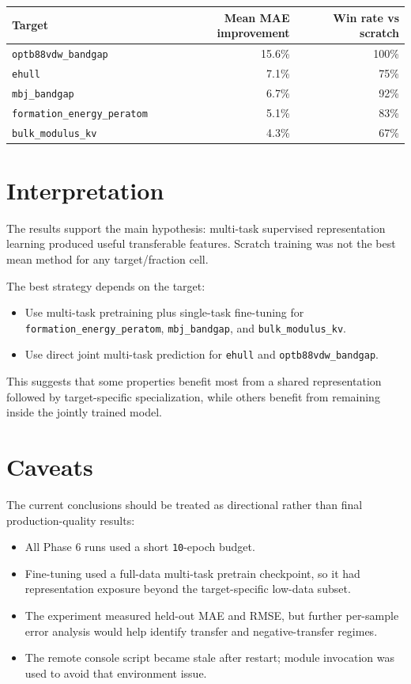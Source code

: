 \documentclass[11pt,a4paper]{article}
\begin{document}
\begin{center}
\begin{tabular}{lrr}
\toprule
Target & Mean MAE improvement & Win rate vs scratch \\
\midrule
\texttt{optb88vdw\_bandgap} & 15.6\% & 100\% \\
\texttt{ehull} & 7.1\% & 75\% \\
\texttt{mbj\_bandgap} & 6.7\% & 92\% \\
\texttt{formation\_energy\_peratom} & 5.1\% & 83\% \\
\texttt{bulk\_modulus\_kv} & 4.3\% & 67\% \\
\bottomrule
\end{tabular}
\end{center}

\section{Interpretation}

The results support the main hypothesis: multi-task supervised representation learning produced useful transferable features.  Scratch training was not the best mean method for any target/fraction cell.

The best strategy depends on the target:

\begin{itemize}
  \item Use multi-task pretraining plus single-task fine-tuning for \texttt{formation\_energy\_peratom}, \texttt{mbj\_bandgap}, and \texttt{bulk\_modulus\_kv}.
  \item Use direct joint multi-task prediction for \texttt{ehull} and \texttt{optb88vdw\_bandgap}.
\end{itemize}

This suggests that some properties benefit most from a shared representation followed by target-specific specialization, while others benefit from remaining inside the jointly trained model.

\section{Caveats}

The current conclusions should be treated as directional rather than final production-quality results:

\begin{itemize}
  \item All Phase 6 runs used a short \texttt{10}-epoch budget.
  \item Fine-tuning used a full-data multi-task pretrain checkpoint, so it had representation exposure beyond the target-specific low-data subset.
  \item The experiment measured held-out MAE and RMSE, but further per-sample error analysis would help identify transfer and negative-transfer regimes.
  \item The remote console script became stale after restart; module invocation was used to avoid that environment issue.
\end{itemize}
\end{document}
